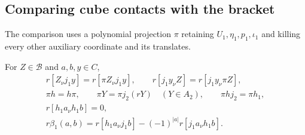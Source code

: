 \subsection{Comparing cube contacts with the bracket}

The comparison uses a polynomial projection $\pi$ retaining
$U_1,\eta_1,p_1,\iota_1$ and killing every other auxiliary
coordinate and its translates.

\begin{lemma}\label{lem:vol2-supported-pbw-reduction}
For $Z\in\mathcal B$ and $a,b,y\in C$,
\begin{gather*}
 r[Z_\nu j_1y]=r[\pi Z_\nu j_1y],\qquad
 r[j_1y_\nu Z]=r[j_1y_\nu\pi Z],\\
 \pi h=h\pi,\qquad \pi Y=\pi j_2(rY)\quad(Y\in A_2),
 \qquad \pi hj_2=\pi h_1,\\
 r[h_1a_\nu h_1b]=0,\\
 r\beta_1(a,b)=r[h_1a_\nu j_1b]
                   -(-1)^{|a|}r[j_1a_\nu h_1b].
\end{gather*}
\end{lemma}

